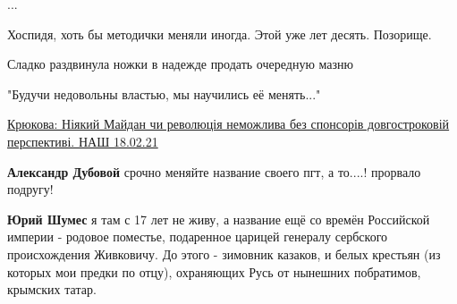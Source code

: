 \begin{itemize}
\begin{itemize}
{...
}



\end{itemize}

 
Хоспидя, хоть бы методички меняли иногда. Этой уже лет десять. Позорище.

 
Сладко раздвинула ножки в надежде продать очередную мазню

 
"Будучи недовольны властью, мы научились её менять..."

\href{https://youtu.be/y2C1mQ7Rbno}{%
Крюкова: Ніякий Майдан чи революція неможлива без спонсорів довгостроковій перспективі. НАШ 18.02.21%
}

\begin{itemize}
 
\textbf{Александр Дубовой} срочно меняйте название своего пгт, а то....! прорвало подругу!

 
\textbf{Юрий Шумес} я там с 17 лет не живу, а название ещё со времён Российской империи - родовое поместье, подаренное царицей генералу сербского происхождения Живковичу. До этого - зимовник казаков, и белых крестьян (из которых мои предки по отцу), охраняющих Русь от нынешних побратимов, крымских татар.
\end{itemize}


\end{itemize}
